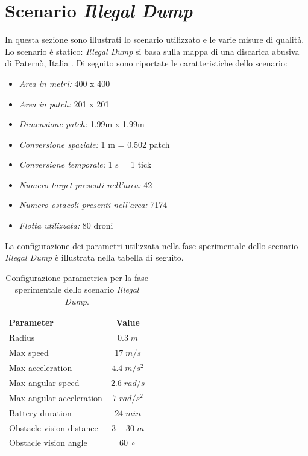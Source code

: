 \section{Scenario \textit{Illegal Dump}}

In questa sezione sono illustrati lo scenario utilizzato e le varie misure di qualità. 
Lo scenario è statico: \textit{Illegal Dump} si basa sulla mappa di una discarica abusiva di Paternò, Italia \cite{trashout2018}.
Di seguito sono riportate le caratteristiche dello scenario:

\begin{itemize}
    \item \textit{Area in metri:} 400 x 400
    \item \textit{Area in patch:} 201 x 201
    \item \textit{Dimensione patch:} 1.99m x 1.99m
    \item \textit{Conversione spaziale:} 1 m = 0.502 patch
    \item \textit{Conversione temporale:} 1 s = 1 tick
    \item \textit{Numero target presenti nell'area:} 42
    \item \textit{Numero ostacoli presenti nell'area:} 7174
    \item \textit{Flotta utilizzata:} 80 droni
\end{itemize}

La configurazione dei parametri utilizzata nella fase sperimentale dello scenario \textit{Illegal Dump} è illustrata nella tabella di seguito.

\begin{table}[H]
    \centering
    
    \begin{tabular}{|l|c|}
    \hline
    \textbf{Parameter}              & \textbf{Value}                \\ \hline
    Radius                          & $0.3 \; m$                    \\ \hline
    Max speed                       & $17 \; m/s$                   \\ \hline
    Max acceleration                & $4.4 \; m/s^{2}$              \\ \hline
    Max angular speed               & $2.6 \; rad/s$                \\ \hline
    Max angular acceleration        & $7 \; rad/s^{2}$              \\ \hline
    Battery duration                & $24 \; min$                   \\ \hline
    Obstacle vision distance        & $3-30 \; m$                   \\ \hline
    Obstacle vision angle           & $60 \; \circ$                     \\ \hline
    \end{tabular}%
    
    \caption{Configurazione parametrica per la fase sperimentale dello scenario \textit{Illegal Dump}.}
    \label{tabella_costanti_dump}
\end{table}

